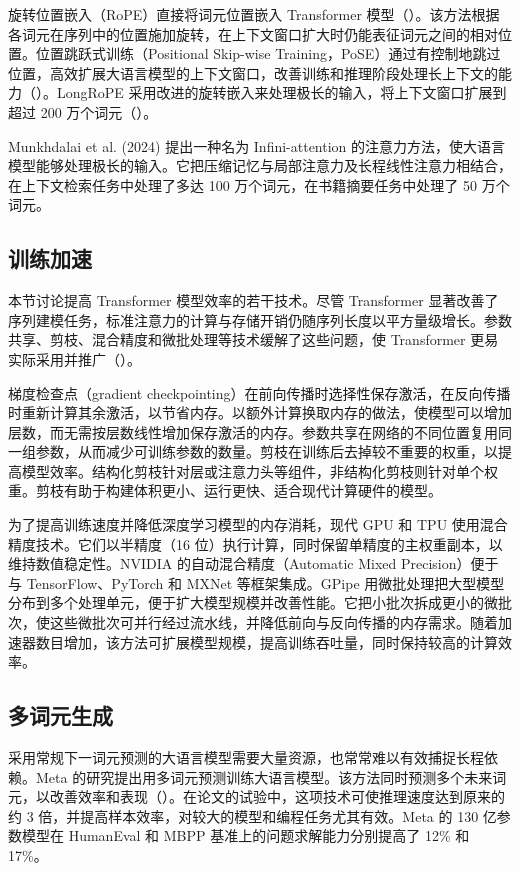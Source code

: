 旋转位置嵌入（RoPE）直接将词元位置嵌入 Transformer 模型（）。该方法根据各词元在序列中的位置施加旋转，在上下文窗口扩大时仍能表征词元之间的相对位置。位置跳跃式训练（Positional Skip-wise Training，PoSE）通过有控制地跳过位置，高效扩展大语言模型的上下文窗口，改善训练和推理阶段处理长上下文的能力（）。LongRoPE 采用改进的旋转嵌入来处理极长的输入，将上下文窗口扩展到超过 200 万个词元（）。

Munkhdalai et al. (2024) 提出一种名为 Infini-attention 的注意力方法，使大语言模型能够处理极长的输入。它把压缩记忆与局部注意力及长程线性注意力相结合，在上下文检索任务中处理了多达 100 万个词元，在书籍摘要任务中处理了 50 万个词元。

\subsection{训练加速}
本节讨论提高 Transformer 模型效率的若干技术。尽管 Transformer 显著改善了序列建模任务，标准注意力的计算与存储开销仍随序列长度以平方量级增长。参数共享、剪枝、混合精度和微批处理等技术缓解了这些问题，使 Transformer 更易实际采用并推广（）。

梯度检查点（gradient checkpointing）在前向传播时选择性保存激活，在反向传播时重新计算其余激活，以节省内存。以额外计算换取内存的做法，使模型可以增加层数，而无需按层数线性增加保存激活的内存。参数共享在网络的不同位置复用同一组参数，从而减少可训练参数的数量。剪枝在训练后去掉较不重要的权重，以提高模型效率。结构化剪枝针对层或注意力头等组件，非结构化剪枝则针对单个权重。剪枝有助于构建体积更小、运行更快、适合现代计算硬件的模型。

为了提高训练速度并降低深度学习模型的内存消耗，现代 GPU 和 TPU 使用混合精度技术。它们以半精度（16 位）执行计算，同时保留单精度的主权重副本，以维持数值稳定性。NVIDIA 的自动混合精度（Automatic Mixed Precision）便于与 TensorFlow、PyTorch 和 MXNet 等框架集成。GPipe 用微批处理把大型模型分布到多个处理单元，便于扩大模型规模并改善性能。它把小批次拆成更小的微批次，使这些微批次可并行经过流水线，并降低前向与反向传播的内存需求。随着加速器数目增加，该方法可扩展模型规模，提高训练吞吐量，同时保持较高的计算效率。

\subsection{多词元生成}
采用常规下一词元预测的大语言模型需要大量资源，也常常难以有效捕捉长程依赖。Meta 的研究提出用多词元预测训练大语言模型。该方法同时预测多个未来词元，以改善效率和表现（）。在论文的试验中，这项技术可使推理速度达到原来的约 3 倍，并提高样本效率，对较大的模型和编程任务尤其有效。Meta 的 130 亿参数模型在 HumanEval 和 MBPP 基准上的问题求解能力分别提高了 12\% 和 17\%。

